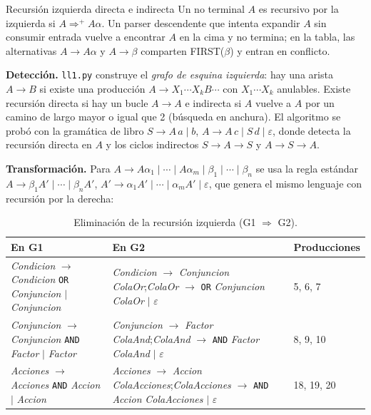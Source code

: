 \documentclass[11pt,letterpaper]{article}
\makeatletter
\renewcommand\subsection{\@startsection{subsection}{2}{\z@}{-2.6ex\@plus -1ex \@minus -.2ex}{1.0ex \@plus .2ex}%
  {\normalfont\large\bfseries}}
\newcommand{\cod}[1]{\texttt{#1}}
\newcommand{\T}[1]{\texttt{#1}}
\newcommand{\NT}[1]{\textit{#1}}
\newcommand{\eps}{\ensuremath{\varepsilon}}
\newcommand{\cabeza}{\rowcolor{cabecera}}
\makeatother
\begin{document}
\subsection{Recursión izquierda directa e indirecta}
Un no terminal $A$ es recursivo por la izquierda si $A \Rightarrow^{+} A\alpha$. Un parser descendente que
intenta expandir $A$ sin consumir entrada vuelve a encontrar $A$ en la cima y no termina; en la tabla, las
alternativas $A \to A\alpha$ y $A \to \beta$ comparten FIRST($\beta$) y entran en conflicto.

\textbf{Detección.} \cod{ll1.py} construye el \emph{grafo de esquina izquierda}: hay una arista $A \to B$ si
existe una producción $A \to X_1 \cdots X_k B \cdots$ con $X_1 \cdots X_k$ anulables. Existe recursión
directa si hay un bucle $A \to A$ e indirecta si $A$ vuelve a $A$ por un camino de largo mayor o igual que 2
(búsqueda en anchura). El algoritmo se probó con la gramática de libro $S \to A\,a \mid b$,
$A \to A\,c \mid S\,d \mid \varepsilon$, donde detecta la recursión directa en $A$ y los ciclos indirectos
$S \to A \to S$ y $A \to S \to A$.

\textbf{Transformación.} Para $A \to A\alpha_1 \mid \cdots \mid A\alpha_m \mid \beta_1 \mid \cdots \mid \beta_n$
se usa la regla estándar
$A \to \beta_1 A' \mid \cdots \mid \beta_n A'$, $A' \to \alpha_1 A' \mid \cdots \mid \alpha_m A' \mid \varepsilon$,
que genera el mismo lenguaje con recursión por la derecha:

\begin{longtable}{>{\raggedright}p{5.6cm}>{\raggedright}p{6.3cm}p{3.2cm}}
\caption{Eliminación de la recursión izquierda (G1 $\Rightarrow$ G2).}\\
\hline\cabeza \textbf{En G1} & \textbf{En G2} & \textbf{Producciones}\\\hline\endfirsthead
\NT{Condicion} $\to$ \NT{Condicion} \T{OR} \NT{Conjuncion} $\mid$ \NT{Conjuncion} &
\NT{Condicion} $\to$ \NT{Conjuncion} \NT{ColaOr};\newline \NT{ColaOr} $\to$ \T{OR} \NT{Conjuncion} \NT{ColaOr} $\mid$ \eps & 5, 6, 7\\
\NT{Conjuncion} $\to$ \NT{Conjuncion} \T{AND} \NT{Factor} $\mid$ \NT{Factor} &
\NT{Conjuncion} $\to$ \NT{Factor} \NT{ColaAnd};\newline \NT{ColaAnd} $\to$ \T{AND} \NT{Factor} \NT{ColaAnd} $\mid$ \eps & 8, 9, 10\\
\NT{Acciones} $\to$ \NT{Acciones} \T{AND} \NT{Accion} $\mid$ \NT{Accion} &
\NT{Acciones} $\to$ \NT{Accion} \NT{ColaAcciones};\newline \NT{ColaAcciones} $\to$ \T{AND} \NT{Accion} \NT{ColaAcciones} $\mid$ \eps & 18, 19, 20\\\hline
\end{longtable}
\end{document}
